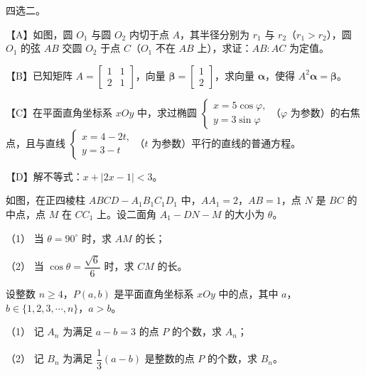 \Needspace{0.4\textheight}
\begin{question}
四选二。

【A】如图，圆 $O_1$ 与圆 $O_2$ 内切于点 $A$，其半径分别为 $r_1$ 与 $r_2$（$r_1>r_2$），圆 $O_1$ 的弦 $AB$ 交圆 $O_2$ 于点 $C$（$O_1$ 不在 $AB$ 上），求证：$AB:AC$ 为定值。
\nopagebreak[4]
\begin{center}\end{center}
\nopagebreak[4]
【B】已知矩阵 $A=\begin{bmatrix}1&1\\2&1\end{bmatrix}$，向量 $\boldsymbol\beta=\begin{bmatrix}1\\2\end{bmatrix}$，求向量 $\boldsymbol\alpha$，使得 $A^2\boldsymbol\alpha=\boldsymbol\beta$。

【C】在平面直角坐标系 $xOy$ 中，求过椭圆 $\begin{cases}x=5\cos\varphi,\\y=3\sin\varphi\end{cases}$（$\varphi$ 为参数）的右焦点，且与直线 $\begin{cases}x=4-2t,\\y=3-t\end{cases}$（$t$ 为参数）平行的直线的普通方程。

【D】解不等式：$x+|2x-1|<3$。

\Needspace{0.4\textheight}
\end{question}
\begin{question}
如图，在正四棱柱 $ABCD-A_1B_1C_1D_1$ 中，$AA_1=2$，$AB=1$，点 $N$ 是 $BC$ 的中点，点 $M$ 在 $CC_1$ 上。设二面角 $A_1-DN-M$ 的大小为 $\theta$。

（1） 当 $\theta=90^\circ$ 时，求 $AM$ 的长；

（2） 当 $\cos\theta=\dfrac{\sqrt6}6$ 时，求 $CM$ 的长。
\nopagebreak[4]
\begin{center}\end{center}
\nopagebreak[4]
\end{question}
\begin{question}
设整数 $n\geqslant4$，$P(a,b)$ 是平面直角坐标系 $xOy$ 中的点，其中 $a$，$b\in\{1,2,3,\cdots,n\}$，$a>b$。

（1） 记 $A_n$ 为满足 $a-b=3$ 的点 $P$ 的个数，求 $A_n$；

（2） 记 $B_n$ 为满足 $\dfrac13(a-b)$ 是整数的点 $P$ 的个数，求 $B_n$。

\end{question}